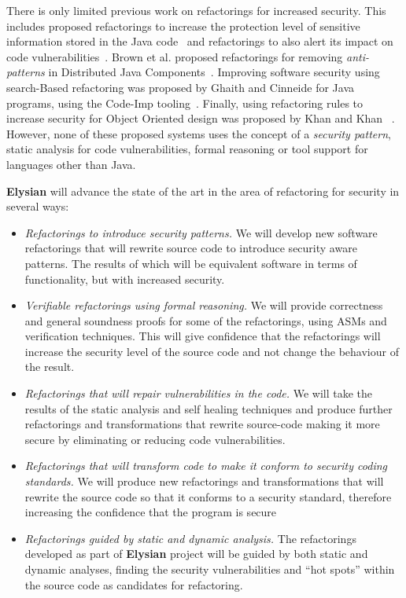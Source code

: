 \documentclass[a4paper,11pt]{article}
\newcommand{\project}[1]{\textbf{#1}\xspace}
\newcommand{\SECURITY}{\project{Elysian}}
\newcommand{\TheProject}{\SECURITY}
\begin{document}
%
There is only limited previous work on refactorings for increased security. This includes proposed refactorings to increase the protection level of sensitive information stored in the Java code~\cite{maru2007} and refactorings to also alert its impact on code vulnerabilities~\cite{maru2008}.
Brown et al. proposed refactorings for removing \emph{anti-patterns} in Distributed Java Components~\cite{brown1998antipatterns}.  Improving software security using search-Based refactoring was proposed by Ghaith and Cinneide for Java programs, using the Code-Imp tooling~\cite{ghaith}. Finally, using refactoring rules to increase security for Object Oriented design was proposed by Khan and Khan~\cite{khan} . However, none of these proposed systems uses the concept of a \emph{security pattern}, static analysis for code vulnerabilities, formal reasoning or tool support for languages other than Java. 
 
\begin{mdframed}[backgroundcolor=gray!10]
\TheProject{} will advance the state of the art in the area of refactoring for security in several ways:
\begin{itemize}
\item \emph{Refactorings to introduce security patterns.} We will develop new software refactorings that will rewrite source code to introduce security aware patterns. The results of which will be equivalent software in terms of functionality, but with increased security.
\item \emph{Verifiable refactorings using formal reasoning.} We will provide correctness and general soundness proofs for some of the refactorings, using ASMs and verification techniques. This will give confidence that the refactorings will increase the security level of the source code and not change the behaviour of the result.
\item \emph{Refactorings that will repair vulnerabilities in the code.} We will take the results of the static analysis and self healing techniques and produce further refactorings and transformations that rewrite source-code making it more secure by eliminating or reducing code vulnerabilities. 
\item \emph{Refactorings that will transform code to make it conform to security coding standards.} We will produce new refactorings and transformations that will rewrite the source code so that it conforms to a security standard, therefore increasing the confidence that the program is secure
\item \emph{Refactorings guided by static and dynamic analysis.} The refactorings developed as part of \TheProject{} project will be guided by both static and dynamic analyses, finding the security vulnerabilities and ``hot spots'' within the source code as candidates for refactoring. 
\end{itemize}
\end{mdframed}
\end{document}
